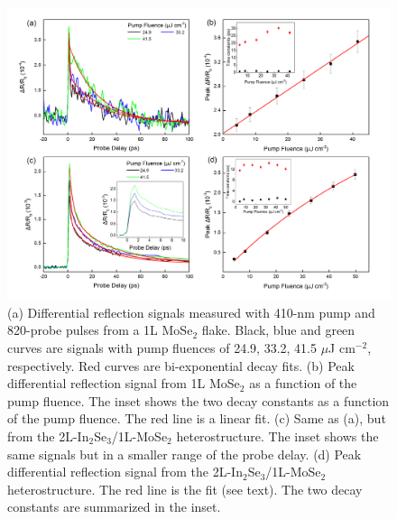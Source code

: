 \documentclass[journal=jacsat,manuscript=article]{achemso}
\begin{document}
\begin{figure}
  \centering
  \includegraphics[width=14cm]{dynamics.jpg}
  \caption{(a) Differential reflection signals measured with 410-nm pump and 820-probe pulses from a 1L MoSe$_2$ flake. Black, blue and green curves are signals with pump fluences of 24.9, 33.2, 41.5 $\mu$J cm$^{-2}$, respectively. Red curves are bi-exponential decay fits. (b) Peak differential reflection signal from 1L MoSe$_2$ as a function of the pump fluence. The inset shows the two decay constants as a function of the pump fluence. The red line is a linear fit. (c) Same as (a), but from the 2L-In$_2$Se$_3$/1L-MoSe$_2$ heterostructure. The inset shows the same signals but in a smaller range of the probe delay. (d) Peak differential reflection signal from the 2L-In$_2$Se$_3$/1L-MoSe$_2$ heterostructure. The red line is the fit (see text). The two decay constants are summarized in the inset.}
    \label{fig:dynamics}
\end{figure}
\end{document}

